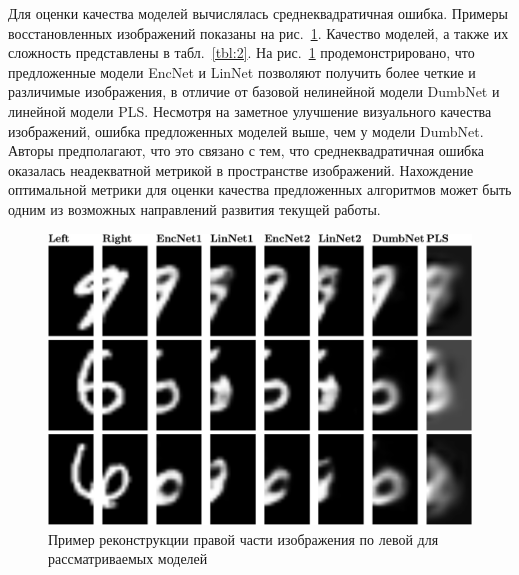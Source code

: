 Для оценки качества моделей вычислялась среднеквадратичная ошибка. Примеры восстановленных изображений показаны на рис.~\ref{fgr:2}. Качество моделей, а также их сложность представлены в табл.~\ref{tbl:2}.
На рис.~\ref{fgr:2} продемонстрировано, что предложенные модели EncNet и LinNet позволяют получить более четкие и различимые изображения, в отличие от базовой нелинейной модели DumbNet и линейной модели PLS.
Несмотря на заметное улучшение визуального качества изображений, ошибка предложенных моделей выше, чем у модели DumbNet.
Авторы предполагают, что это связано с тем, что среднеквадратичная ошибка оказалась неадекватной метрикой в пространстве изображений.
Нахождение оптимальной метрики для оценки качества предложенных алгоритмов может быть одним из возможных направлений развития текущей работы.

\begin{figure}[!tp]
\centering \includegraphics[width=\linewidth]{figs/ch2/mnist_preds}
\caption{Пример реконструкции правой части изображения по левой для рассматриваемых моделей}
\label{fgr:2}
\end{figure}
